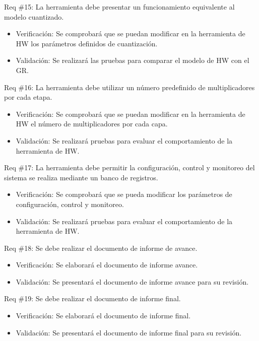 \documentclass[11pt]{charter}
\begin{document}
Req \#15: La herramienta debe presentar un funcionamiento equivalente al modelo cuantizado.

\begin{itemize}
\item Verificación: Se comprobará que se puedan modificar en la herramienta de HW los parámetros definidos de cuantización. 
\item Validación: Se realizará las pruebas para comparar el modelo de HW con el GR.  
\end{itemize}

Req \#16: La herramienta debe utilizar un número predefinido de multiplicadores por cada etapa.

\begin{itemize}
\item Verificación: Se comprobará que se puedan modificar en la herramienta de HW el número de multiplicadores por cada capa. 
\item Validación: Se realizará pruebas para evaluar el comportamiento de la herramienta de HW.  
\end{itemize}

Req \#17: La herramienta debe permitir la configuración, control y monitoreo del sistema se realiza mediante un banco de registros.

\begin{itemize}
\item Verificación: Se comprobará que se pueda modificar los parámetros de configuración, control y monitoreo. 
\item Validación: Se realizará pruebas para evaluar el comportamiento de la herramienta de HW.  
\end{itemize}

Req \#18: Se debe realizar el documento de informe de avance.

\begin{itemize}
\item Verificación: Se elaborará el documento de informe avance. 
\item Validación: Se presentará el documento de informe avance para su revisión.  
\end{itemize}

Req \#19: Se debe realizar el documento de informe final.

\begin{itemize}
\item Verificación: Se elaborará el documento de informe final. 
\item Validación: Se presentará el documento de informe final para su revisión. 
\end{itemize}
\end{document}
